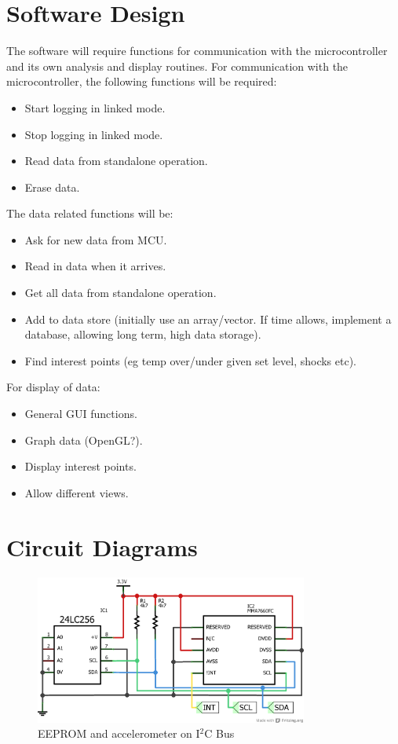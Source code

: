 \documentclass[a4paper,11pt]{article}  %
\begin{document}
\section{Software Design}
\label{sec:software-design}

The software will require functions for communication with the
microcontroller and its own analysis and display routines. For
communication with the microcontroller, the following functions
will be required:
\begin{itemize}
  \item Start logging in linked mode.
  \item Stop logging in linked mode.
  \item Read data from standalone operation.
  \item Erase data.
\end{itemize}
The data related functions will be:
\begin{itemize}
  \item Ask for new data from MCU.
  \item Read in data when it arrives.
  \item Get all data from standalone operation.
  \item Add to data store (initially use an array/vector. If time
    allows, implement a database, allowing long term, high data storage).
  \item Find interest points (eg temp over/under given set level,
    shocks etc).
\end{itemize}
For display of data:
\begin{itemize}
  \item General GUI functions.
  \item Graph data (OpenGL?).
  \item Display interest points.
  \item Allow different views.
\end{itemize}

\newpage
\appendix

\section{Circuit Diagrams}
\label{sec:circuit-diagrams}

\begin{figure}[!h]
  \begin{center}
    \includegraphics[width=0.8\textwidth]{i2c_schem.png}
  \end{center}
  \caption{EEPROM and accelerometer on I$^2$C Bus}
  \label{fig:i2cbus}
\end{figure}
\end{document}
